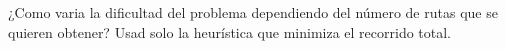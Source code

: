 
¿Como varia la dificultad del problema dependiendo del número de rutas que se quieren obtener? Usad solo la heurística que minimiza el recorrido total.